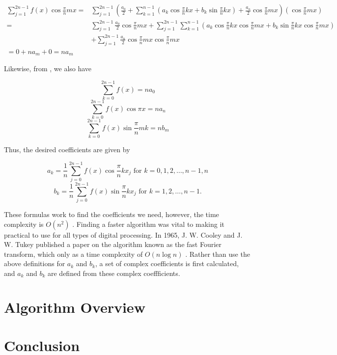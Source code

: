 \documentclass[11pt]{article}
\begin{document}
\begin{align*}
    \sum_{j=1}^{2n-1} f(x) \cos \frac{\pi}{n}mx = & \sum_{j=1}^{2n-1} \left(\frac{a_0}{2} + \sum_{k=1}^{n-1} \left( a_k \cos \frac{\pi}{n}kx + b_k \sin \frac{\pi}{n}kx \right) + \frac{a_n}{2} \cos \frac{\pi}{n}mx\right)\left(\cos \frac{\pi}{n}mx\right) \\
    = & \sum_{j=1}^{2n-1} \frac{a_0}{2}\cos \frac{\pi}{n}mx + \sum_{j=1}^{2n-1}\sum_{k=1}^{n-1} \left( a_k \cos \frac{\pi}{n}kx\cos \frac{\pi}{n}mx + b_k \sin \frac{\pi}{n}kx \cos \frac{\pi}{n}mx\right)  \\
    {} & + \sum_{j=1}^{2n-1}\frac{a_n}{2} \cos \frac{\pi}{n}mx\cos \frac{\pi}{n}mx \\
    = 0 + na_m + 0
    = na_m
\end{align*}

Likewise, from \cite{hamming}, we also have

\[\sum_{k=0}^{2n-1} f(x) = na_0\]
\[\sum_{k=0}^{2n-1} f(x)\cos \pi x = na_n\]
\[\sum_{k=0}^{2n-1} f(x) \sin \frac{\pi}{n}mk = nb_m\]

Thus, the desired coefficients are given by

\[a_k = \frac{1}{n} \sum_{j=0}^{2n-1} f(x) \cos \frac{\pi}{n}kx_j \text{ for }k=0, 1, 2, \ldots, n-1, n\]
\[b_k = \frac{1}{n} \sum_{j=0}^{2n-1} f(x) \sin \frac{\pi}{n}kx_j \text{ for }k=1, 2, \ldots, n-1.\]

These formulas work to find the coefficients we need, however, the time complexity is $O(n^2)$ \cite{brigham}. Finding a faster algorithm was vital to making it practical to use for all types of digital processing. In 1965, J. W. Cooley and J. W. Tukey published a paper on the algorithm known as the fast Fourier transform, which only as a time complexity of $O(n \log n)$ \cite{textbook}. Rather than use the above definitions for $a_k$ and $b_k$, a set of complex coefficients is first calculated, and $a_k$ and $b_k$ are defined from these complex coeffficients.

\section*{Algorithm Overview}


\section*{Conclusion}


\printbibliography[
heading=bibintoc,
title={Whole bibliography}
]
\end{document}
